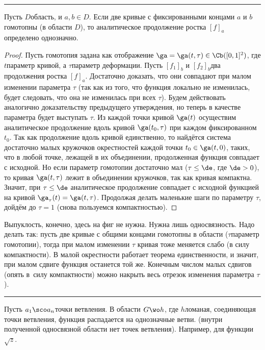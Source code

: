 \documentclass[a4paper]{article}
\newenvironment{petit}
{\par \smallskip \hrule \smallskip \footnotesize}
{\par \smallskip \hrule \smallskip}
\begin{document}
\begin{theorem}
\begin{petit}
\begin{theorem}[о монодромии]
Пусть $D$\т область, и $a,b\in D$. Если две кривые с фиксированными концами $a$ и $b$ гомотопны (в области $D$),
то аналитическое продолжение ростка $[f]_a$ определено однозначно.
\end{theorem}
\begin{proof}
Пусть гомотопия задана как отображение $\ga=\ga(t,\tau) \in \Cb([0,1]^2)$, где $t$\т параметр кривой, а $\tau$\т параметр
деформации. Пусть $[f_1]_b$ и $[f_2]_b$\т два продолжения ростка $[f]_a$. Достаточно доказать, что они совпадают при
малом изменении параметра $\tau$ (так как из того, что функция локально не изменилась, будет следовать, что она не изменилась
при всех $\tau$). Будем действовать аналогично доказательству предыдущего утверждения, но теперь в качестве
параметра будет выступать $\tau$. Из каждой точки кривой $\ga(t)$ осуществим аналитическое продолжение вдоль кривой $\ga(t_0,\tau)$
при каждом фиксированном $t_0$. Так как продолжение вдоль кривой единственно, то найдётся система достаточно малых кружочков\т
окрестностей каждой точки $t_0\in\ga(t,0)$, таких, что в любой точке, лежащей в их объединении, продолженная функция совпадает
с исходной. Но если параметр гомотопии достаточно мал ($\tau \le \de$, где $\de>0$), то кривая $\ga(t,\tau)$ лежит в объединении
кружочков, так как кривая компактна. Значит, при $\tau\le\de$ аналитическое продолжение совпадает с исходной функцией
на кривой $\ga_\tau(t)= \ga(t,\tau)$. Продолжая делать маленькие шаги по параметру $\tau$, дойдём до $\tau=1$
(снова пользуемся компактностью).
\end{proof}


Выпуклость, конечно, здесь на фиг не нужна. Нужна лишь односвязность. Надо делать так: пусть две кривые с
общими концами гомотопны в области ($\tau$\т параметр гомотопии), тогда при малом изменении $\tau$ кривая тоже
меняется слабо (в силу компактности). В малой окрестности работает теорема единственности, и значит, при малом
сдвиге функция останется той же. Конечным числом малых сдвигов (опять в~силу компактности) можно накрыть весь
отрезок изменения параметра $\tau$).
\end{petit}

\begin{ex}
Пусть $a_1\sco a_n$\т точки ветвления. В области $G\wo h$, где $h$\т ломаная, соединяющая точки ветвления,
функция распадается на однозначные ветви. (внутри полученной односвязной области нет точек ветвления).
Например, для функции $\sqrt{z}$.
\end{ex}


\end{theorem}
\end{document}
